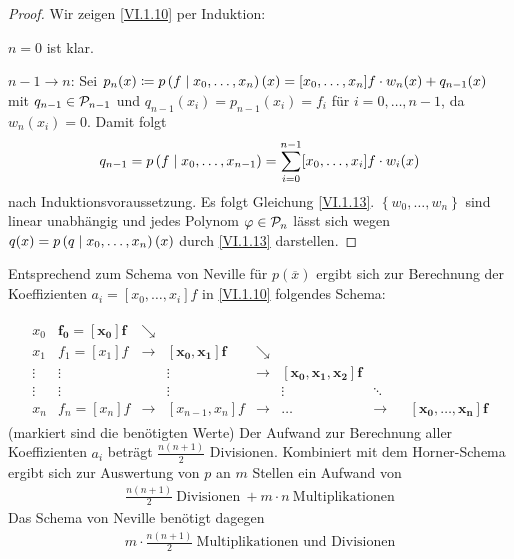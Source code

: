 \begin{proof}
  Wir zeigen \eqref{VI.1.10} per Induktion:

  $n=0$ ist klar.

  $n-1\rightarrow n$: Sei $p_n(x)\coloneqq p\left( f \mid x_0,\dotsc,x_n \right)(x)
  = [x_0,\dots, x_n]f \cdot w_n(x) + q_{n-1}(x)$ mit
  $q_{n-1}\in\mathcal{P}_{n-1}$ und $q_{n-1}(x_i)=p_{n-1}(x_i)=f_i$
  für $i=0,\dotsc,n-1$, da $w_n(x_i)=0$.
  Damit folgt
  \begin{gather*}
    q_{n-1} = p\left( f \mid x_0,\dotsc,x_{n-1} \right)
    =\sum_{i=0}^{n-1}[x_0,\dotsc, x_i]f\cdot w_i(x)
  \end{gather*}
  nach Induktionsvoraussetzung. 
  Es folgt Gleichung  \eqref{VI.1.13}.
  $\left\{w_0, \dotsc,w_n\right\}$ sind linear unabhängig
  und jedes Polynom $\varphi\in\mathcal{P}_n$
  lässt sich wegen $q(x)=p\left( q \mid x_0,\dotsc,x_n \right)(x)$
  durch \eqref{VI.1.13} darstellen.
\end{proof}

Entsprechend zum Schema von Neville für $p(\overline{x})$
ergibt sich zur Berechnung der Koeffizienten $a_i=[x_0,\dotsc,x_i]f$
in \eqref{VI.1.10} folgendes Schema:

\begin{gather*}
  \begin{array}{ccccccccc}
    x_0 & \boldsymbol{f_0=[x_0]f} & \searrow\\
    x_1 & f_1=[x_1]f& \rightarrow &\boldsymbol{ [x_0,x_1]f}&\searrow \\
    \vdots&\vdots &&\vdots &\rightarrow & \boldsymbol{[x_0,x_1,x_2]f}\\
    \vdots&\vdots &&\vdots &&\vdots&\ddots\\
    x_n& f_n=[x_n]f &\rightarrow&[x_{n-1},x_n]f&\rightarrow &
                                                              \dots &\rightarrow && \boldsymbol{[x_0,\dotsc,x_n]f}
  \end{array}
\end{gather*}
(markiert sind die benötigten Werte)
Der Aufwand zur Berechnung aller Koeffizienten $a_i$ beträgt
$\frac{n(n+1)}{2}$ Divisionen.
Kombiniert mit dem Horner-Schema ergibt sich
zur Auswertung von $p$ an $m$ Stellen ein Aufwand von
\begin{gather*}
  \frac{n(n+1)}{2} ~\text{Divisionen}
  ~+m\cdot n   ~\text{Multiplikationen}
\end{gather*}
Das Schema von Neville benötigt dagegen
\begin{gather*}
  m\cdot\frac{n(n+1)}{2} ~\text{Multiplikationen und Divisionen}
\end{gather*}

